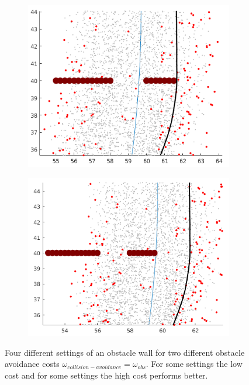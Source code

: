 \begin{figure}[h]
\begin{subfigure}{.24\textwidth}
	\includegraphics[width=\textwidth]{figures/dyn_prog_dis_3_high.png}
	\end{subfigure}
	\begin{subfigure}{.24\textwidth}
	\includegraphics[width=\textwidth]{figures/dyn_prog_dis_4_high.png}
	\end{subfigure}
	\caption{Four different settings of an obstacle wall for two different obstacle avoidance costs $\omega_{collision-avoidance} = \omega_{obs}$. For some settings the low cost and for some settings the high cost performs better.}
	\label{fig:dyn_prog_discussion}
\end{figure}

